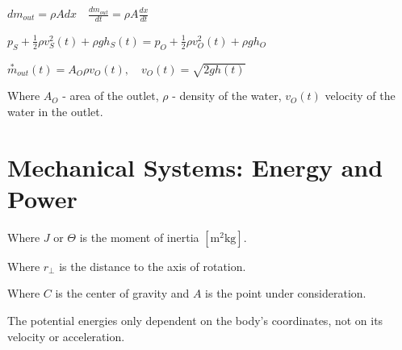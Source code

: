 \documentclass[10pt,a4paper]{scrartcl}
\begin{document}
\begin{multicols*}{3}
\begin{enumerate}
$dm_{out}=\rho A dx\quad \frac{dm_{out}}{dt}=\rho A \frac{dx}{dt}$

$p_S+\frac{1}{2}\rho v_S^2(t)+\rho gh_S(t)=p_O+\frac{1}{2}\rho v_O^2(t)+\rho g h_O$

$\overset{\ast}{m}_{out}(t)=A_O\rho v_O(t),\quad v_O(t)=\sqrt{2gh(t)}$

Where $A_O$ - area of the outlet, $\rho$ - density of the water, $v_O(t)$ velocity of the water in the outlet.
\end{enumerate}

\vfill
\null
\newpage

\section{Mechanical Systems: Energy and Power}



Where $J$ or $\Theta$ is the moment of inertia $[\si{\meter\squared\kilogram}]$.



Where $r_\perp$ is the distance to the axis of rotation.


Where $C$ is the center of gravity and $A$ is the point under consideration.




The potential energies only dependent on the body's coordinates, not on its velocity or acceleration.




\end{multicols*}
\end{document}
